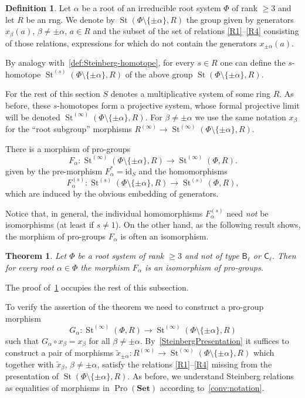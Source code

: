 \documentclass{article}
\newtheorem{theorem}{Theorem}
\theoremstyle{definition}
\newtheorem{df}[lemma]{Definition} \Crefname{df}{Definition}{Definitions}
\theoremstyle{remark}
\DeclareMathOperator\St{St}
\DeclareMathOperator{\Pro}{Pro}
\newcommand{\Set}{\mathbf{Set}}
\newcommand{\rB}{\mathsf{B}}
\newcommand{\rC}{\mathsf{C}}
\begin{document}
\begin{df} Let $\alpha$ be a root of an irreducible root system $\Phi$ of rank $\geq 3$ and let $R$ be an rng. We denote by $\St(\Phi\setminus\{\pm \alpha\}, R)$ the group given by generators $x_\beta(a)$, $\beta \neq \pm \alpha$, $a\in R$ and the subset of the set of relations \eqref{R1}--\eqref{R4} consisting of those relations, expressions for which do not contain the generators $x_{\pm\alpha}(a)$.
\end{df}

By analogy with~\cref{def:Steinberg-homotope}, for every $s\in R$ one can define the $s$-homotope $\St^{(s)}(\Phi\setminus\{\pm \alpha\}, R)$ of the above group $\St(\Phi\setminus\{\pm \alpha\}, R)$. 

For the rest of this section $S$ denotes a multiplicative system of some ring $R$.
As before, these $s$-homotopes form a projective system, whose formal projective limit will be denoted $\St^{(\infty)}(\Phi \setminus\{\pm \alpha\}, R)$. 
For $\beta \neq \pm\alpha$ we use the same notation $x_\beta$ for the ``root subgroup'' morphisms $R^{(\infty)}\to \St^{(\infty)}(\Phi \setminus\{\pm\alpha\}, R)$.

There is a morphism of pro-groups
\[ F_\alpha \colon \St^{(\infty)}(\Phi \setminus\{\pm\alpha\}, R) \to \St^{(\infty)}(\Phi, R). \]
given by the pre-morphism $F_\alpha^{*} = \mathrm{id}_S$ and the homomorphisms \[F_\alpha^{(s)} \colon \St^{(s)}(\Phi \setminus\{\pm\alpha\}, R) \to \St^{(s)}(\Phi, R),\] which are induced by the obvious embedding of generators.

Notice that, in general, the individual homomorphisms $F_\alpha^{(s)}$ need {\it not} be isomorphisms (at least if $s \neq 1$). On the other hand, as the following result shows, the morphism of pro-groups $F_\alpha$ is often an isomorphism. 
\begin{theorem}\label{SingleRootElimination}
 Let \(\Phi\) be a root system of rank \(\geq 3\) and not of type \(\rB_\ell\) or \(\rC_\ell\). Then for every root \(\alpha \in \Phi\) the morphism $F_\alpha$ is an isomorphism of pro-groups.
\end{theorem}
The proof of~\cref{SingleRootElimination} occupies the rest of this subsection.

To verify the assertion of the theorem we need to construct a pro-group morphism \[G_\alpha \colon \St^{(\infty)}(\Phi, R) \to \St^{(\infty)}(\Phi \setminus \{\pm\alpha\}, R)\] such that \(G_\alpha \circ x_\beta = x_\beta\) for all \(\beta \neq \pm \alpha\). By~\cref{SteinbergPresentation} it suffices to construct a pair of morphisms \(\widetilde x_{\pm \alpha} \colon R^{(\infty)} \to \St^{(\infty)}(\Phi \setminus \{\pm \alpha\}, R)\) which together with $\widetilde{x}_\beta$, $\beta\neq \pm\alpha$, satisfy the relations \eqref{R1}--\eqref{R4} missing from the presentation of $\St(\Phi\setminus\{\pm\alpha\}, R)$. As before, we understand Steinberg relations as equalities of morphisms in $\Pro(\Set)$ according to~\cref{conv:notation}.
 
\end{document}
